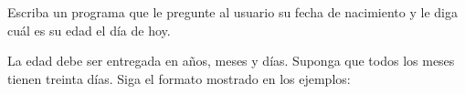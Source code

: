 Escriba un programa que le pregunte al usuario su fecha de nacimiento
y le diga cuál es su edad el día de hoy.

La edad debe ser entregada en años, meses y días.
Suponga que todos los meses tienen treinta días.
Siga el formato mostrado en los ejemplos:

\begin{minipage}[t]{.48\textwidth}
  
\end{minipage}
\hfill
\begin{minipage}[t]{.48\textwidth}
  
\end{minipage}

\begin{minipage}[t]{.48\textwidth}
  
\end{minipage}
\hfill
\begin{minipage}[t]{.48\textwidth}
  
\end{minipage}


